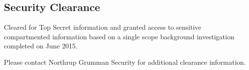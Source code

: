 \subsection*{Security Clearance}
{}
Cleared for Top Secret information and granted access to sensitive compartmented information based on a single scope background investigation completed on June 2015.

Please contact Northrup Grumman Security for additional clearance information.
